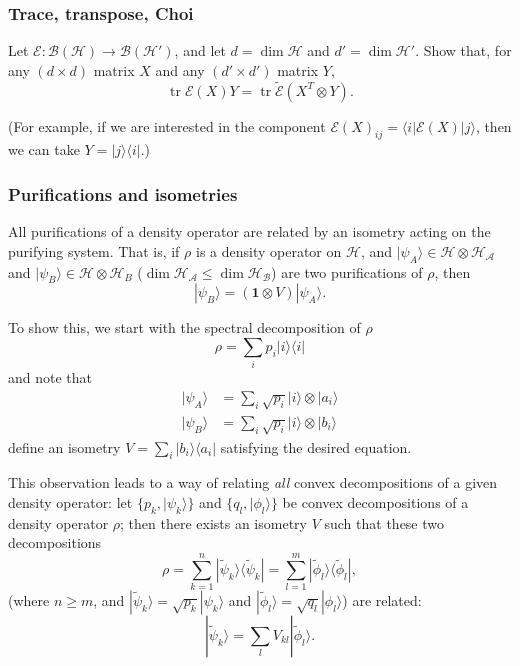 \documentclass[fleqn]{article}
\begin{document}
\hypertarget{trace-transpose-choi}{%
\subsubsection{Trace, transpose, Choi}\label{trace-transpose-choi}}

Let \(\mathcal{E}\colon\mathcal{B}(\mathcal{H})\to\mathcal{B}(\mathcal{H}')\), and let \(d=\dim\mathcal{H}\) and \(d'=\dim\mathcal{H}'\).
Show that, for any \((d\times d)\) matrix \(X\) and any \((d'\times d')\) matrix \(Y\),
\[
  \operatorname{tr}\mathcal{E}(X)Y
  = \operatorname{tr}\widetilde{\mathcal{E}} (X^T\otimes Y).
\]

(For example, if we are interested in the component \(\mathcal{E}(X)_{ij}=\langle i|\mathcal{E}(X)|j\rangle\), then we can take \(Y=|j\rangle\langle i|\).)

\hypertarget{purifications-and-isometries}{%
\subsubsection{Purifications and isometries}\label{purifications-and-isometries}}

All purifications of a density operator are related by an isometry acting on the purifying system.
That is, if \(\rho\) is a density operator on \(\mathcal{H}\), and \(|\psi_A\rangle\in \mathcal{H}\otimes\mathcal{H}_\mathcal{A}\) and \(|\psi_B\rangle\in\mathcal{H}\otimes\mathcal{H}_B\) (\(\dim\mathcal{H}_\mathcal{A}\leqslant\dim\mathcal{H}_\mathcal{B}\)) are two purifications of \(\rho\), then
\[
  |\psi_B\rangle=(\mathbf{1}\otimes V)|\psi_A\rangle.
\]

To show this, we start with the spectral decomposition of \(\rho\)
\[
  \rho = \sum_i p_i|i\rangle\langle i|
\]
and note that
\[
  \begin{aligned}
    |\psi_A\rangle
    &= \sum_i \sqrt{p_i} |i\rangle\otimes|a_i\rangle
  \\|\psi_B\rangle
    &= \sum_i \sqrt{p_i} |i\rangle\otimes|b_i\rangle
  \end{aligned}
\]
define an isometry \(V=\sum_i |b_i\rangle\langle a_i|\) satisfying the desired equation.

This observation leads to a way of relating \emph{all} convex decompositions of a given density operator: let \(\{p_k,|\psi_k\rangle\}\) and \(\{q_l,|\phi_l\rangle\}\) be convex decompositions of a density operator \(\rho\);
then there exists an isometry \(V\) such that these two decompositions
\[
  \rho
  = \sum_{k=1}^n|\widetilde{\psi}_k\rangle\langle\widetilde{\psi}_k|
  = \sum_{l=1}^m|\widetilde{\phi}_l\rangle\langle\widetilde{\phi}_l|,
\]
(where \(n\geqslant m\), and \(|\widetilde{\psi}_k\rangle=\sqrt{p_k}|\psi_k\rangle\) and \(|\widetilde{ \phi}_l\rangle=\sqrt{q_l}|\phi_l\rangle\)) are related:
\[
  |\widetilde{\psi}_k\rangle = \sum_{l} V_{kl} |\widetilde{\phi}_l\rangle.
\]
\end{document}
